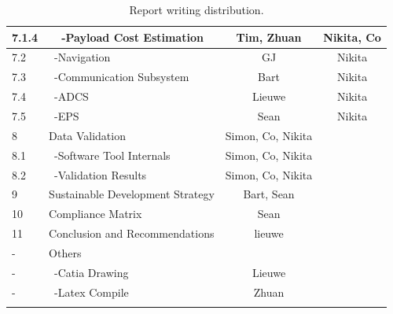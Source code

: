 \begin{center}
\begin{longtable}{|l|l|c|c|}
 7.1.4   & \ \ -Payload Cost Estimation        & Tim, Zhuan & Nikita, Co\\\hline
 7.2   & \ -Navigation                        & GJ & Nikita\\\hline
 7.3     & \ -Communication Subsystem           & Bart & Nikita\\\hline
 7.4     & \ -ADCS                              & Lieuwe & Nikita\\\hline
 7.5     & \ -EPS                               & Sean & Nikita\\\hline
 8       & Data Validation                      & Simon, Co, Nikita &\\\hline
 8.1     & \ -Software Tool Internals           & Simon, Co, Nikita &\\\hline
 8.2     & \ -Validation Results                & Simon, Co, Nikita &\\\hline
 9       & Sustainable Development Strategy     &Bart, Sean &\\\hline
 10      & Compliance Matrix                    & Sean &\\\hline\hline
 11      & Conclusion and Recommendations       & lieuwe &\\\hline\hline
 -       & Others                               &&\\\hline
 -       & \ -Catia Drawing                     & Lieuwe &\\\hline
 -       & \ -Latex Compile                     & Zhuan &\\\hline

\caption{Report writing distribution.}
\label{tab:RWD}
\end{longtable}
\end{center}
